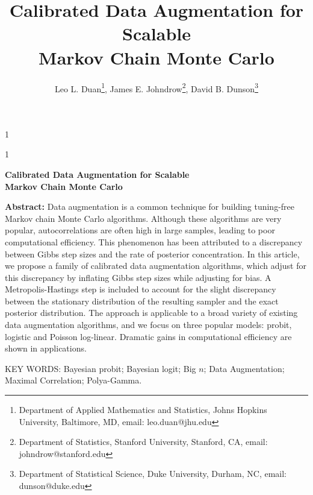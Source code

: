 \documentclass[12pt]{article}
\newcommand{\blind}{1}
\begin{document}
\def\spacingset#1{\renewcommand{\baselinestretch}%
{#1}\small\normalsize} \spacingset{1}

\blind
{
  \title{\bf Calibrated Data Augmentation for Scalable \\ Markov Chain Monte Carlo}
  \author{ Leo L. Duan\thanks{Department of Applied Mathematics and Statistics, Johns Hopkins University, Baltimore, MD, email: leo.duan@jhu.edu},
     James E. Johndrow\thanks{Department of Statistics, Stanford University, Stanford, CA, email: johndrow@stanford.edu},
     David B. Dunson\thanks{Department of Statistical Science, Duke University, Durham, NC, email: dunson@duke.edu}}
  \maketitle
} \fi

\blind
{
  \bigskip
  \bigskip
  \bigskip
  \begin{center}
    {\LARGE\bf Calibrated Data Augmentation for Scalable \\ Markov Chain Monte Carlo}
\end{center}
  \medskip
} \fi

{\bf Abstract:} Data augmentation is a common technique for building tuning-free Markov chain Monte Carlo algorithms. Although these algorithms are very popular, 
autocorrelations are often high in large samples, leading to poor computational efficiency.  This phenomenon has been attributed to a discrepancy between Gibbs step sizes and the rate of posterior concentration.  In this article, we propose a family of calibrated data augmentation algorithms, which adjust for this discrepancy by inflating Gibbs step sizes  while adjusting for bias.  A Metropolis-Hastings step is included to account for the slight discrepancy between the stationary distribution of the resulting sampler and the exact posterior distribution.  The approach is applicable to a broad variety of existing data augmentation algorithms, and we focus on three popular models: probit, logistic and Poisson log-linear.   Dramatic gains in computational efficiency are shown in applications.
\vskip 12pt 

{\noindent  KEY WORDS:  Bayesian probit; Bayesian logit; Big $n$; Data Augmentation; Maximal Correlation; Polya-Gamma.}

\vfill

\newpage
\spacingset{1.45} %


\end{document}
